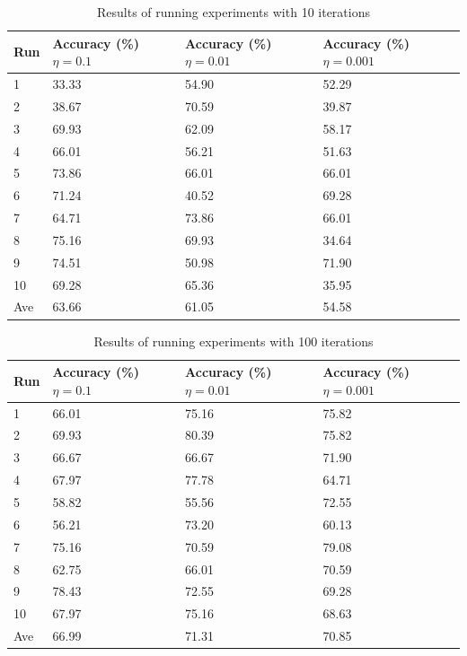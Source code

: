 \documentclass[10pt,twocolumn,a4paper]{article}
\begin{document}
\begin{table}[h!]
\begin{center}
\begin{tabular}{ |p{2em}|p{5em}|p{5em}|p{5em}| } 
\hline
Run & Accuracy (\%) $\eta=0.1$ & Accuracy (\%) $\eta=0.01$ & Accuracy (\%) $\eta=0.001$\\
\hline
1 & 33.33 & 54.90 & 52.29 \\
2 & 38.67 & 70.59 & 39.87\\
3 & 69.93	& 62.09 & 58.17 \\
4 & 66.01	& 56.21 & 51.63 \\
5 & 73.86	& 66.01 & 66.01 \\
6 & 71.24	& 40.52 & 69.28 \\
7 & 64.71	& 73.86 & 66.01 \\
8 & 75.16	& 69.93 & 34.64 \\
9 & 74.51	& 50.98 & 71.90 \\
10 & 69.28	& 65.36 & 35.95 \\
\hline
Ave & 63.66	& 61.05 & 54.58 \\
\hline
\end{tabular}
\caption{Results of running experiments with 10 iterations}
\label{table:10iterations}
\end{center}
\end{table}

\begin{table}[h!]
\begin{center}
\begin{tabular}{ |p{2em}|p{5em}|p{5em}|p{5em}| } 
\hline
Run & Accuracy (\%) $\eta=0.1$ & Accuracy (\%) $\eta=0.01$ & Accuracy (\%) $\eta=0.001$\\
\hline
1 & 66.01 & 75.16 & 75.82 \\
2 & 69.93 & 80.39 & 75.82 \\
3 & 66.67 & 66.67 & 71.90 \\
4& 67.97 & 77.78 & 64.71 \\
5& 58.82 & 55.56 & 72.55 \\
6& 56.21 & 73.20 & 60.13 \\
7& 75.16 & 70.59 & 79.08 \\
8& 62.75 & 66.01 & 70.59 \\
9& 78.43 & 72.55 & 69.28 \\
10& 67.97 & 75.16 & 68.63 \\
\hline
Ave& 66.99 & 71.31 & 70.85 \\

\hline
\end{tabular}
\caption{Results of running experiments with 100 iterations}
\label{table:100iterations}
\end{center}
\end{table}
\end{document}
